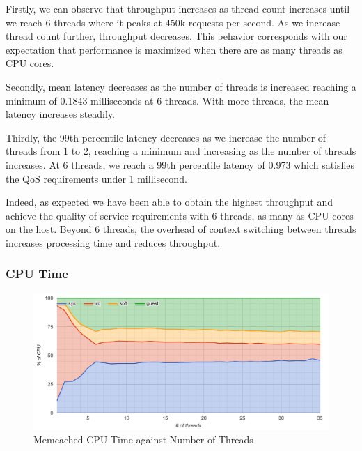 Firstly, we can observe that throughput increases as thread count increases until we reach 6 threads where it peaks at 450k requests per second. As we increase thread count further, throughput decreases. This behavior corresponds with our expectation that performance is maximized when there are as many threads as CPU cores.

Secondly, mean latency decreases as the number of threads is increased reaching a minimum of 0.1843 milliseconds at 6 threads. With more threads, the mean latency increases steadily.

Thirdly, the 99th percentile latency decreases as we increase the number of threads from 1 to 2, reaching a minimum and increasing as the number of threads increases. At 6 threads, we reach a 99th percentile latency of 0.973 which satisfies the QoS requirements under 1 millisecond.

Indeed, as expected we have been able to obtain the highest throughput and achieve the quality of service requirements with 6 threads, as many as CPU cores on the host. Beyond 6 threads, the overhead of context switching between threads increases processing time and reduces throughput.

\subsubsection{CPU Time}

\begin{figure}[h]
    \includegraphics[width=\textwidth]{./res/5_threads_cpu.png}
    \caption{Memcached CPU Time against Number of Threads}
    \label{fig:memcached-threads-cpu}
\end{figure}

